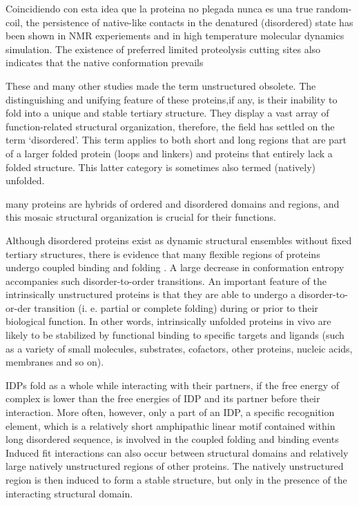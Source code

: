 Coincidiendo con esta idea que la proteina no plegada nunca es una true random-coil, the persistence of native-like contacts in the denatured (disordered) state has been shown in NMR experiements and in high temperature molecular dynamics simulation. The existence of preferred limited proteolysis cutting sites also indicates that the native conformation prevails

These and many other studies made the term unstructured obsolete. 
The distinguishing and unifying feature of these proteins,if any, is their inability to fold into a unique and stable tertiary structure.
They display a vast array of function-related structural organization, therefore, the field has settled on the term ‘disordered’. 
This term applies to both short and long regions that are part of a larger folded protein (loops and linkers) and proteins that entirely lack a folded structure. 
This latter category is sometimes also termed (natively) unfolded. 

many proteins are hybrids of ordered and disordered domains and regions, and this mosaic structural organization is crucial for their functions.



Although disordered proteins exist as dynamic structural ensembles without fixed tertiary structures, there is evidence that many flexible regions of proteins undergo coupled binding and folding \cite{dyson2005intrinsically}. 
A large decrease in conformation entropy accompanies such disorder-to-order transitions. 
An important feature of the intrinsically unstructured proteins is that they are able to undergo a disorder-to-or-der transition (i. e. partial or complete folding) during or prior to their biological function. 
In other words, intrinsically unfolded proteins in vivo are likely to be stabilized by functional binding to specific targets and ligands (such as a variety of small molecules, substrates, cofactors, other proteins, nucleic acids, membranes and so on). 



IDPs fold as a whole while interacting with their partners, if the free energy of complex is lower than the free energies of IDP and its partner before their interaction.
More often, however, only a part of an IDP, a specific recognition element, which is a relatively short amphipathic linear motif contained within long disordered sequence, is involved in the coupled folding and binding events
Induced fit interactions can also occur between structural domains and relatively large natively unstructured regions of other proteins. 
The natively unstructured region is then induced to form a stable structure, but only in the presence of the interacting structural domain.

